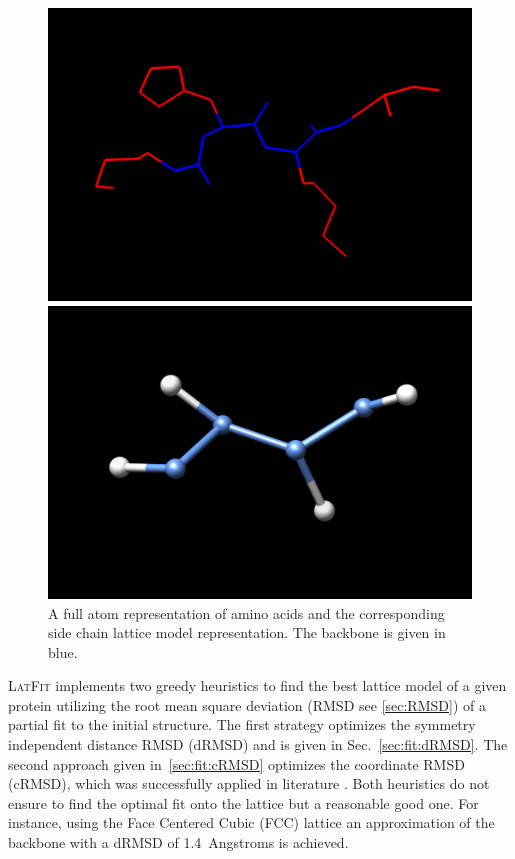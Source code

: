 \documentclass{article}
\newcommand{\latfit}{\textsc{LatFit}}
\begin{document}
\begin{figure}[H]
\begin{center}
	\begin{minipage}{0.4\textwidth}
		\includegraphics[width=\textwidth]{fit_pdb}
	\end{minipage}
	\begin{minipage}{0.4\textwidth}
		\includegraphics[width=\textwidth]{fit_lat_sc}
	\end{minipage}
\end{center}
\caption{A full atom representation of amino acids and the corresponding side
chain lattice model representation. The backbone is given in blue.}
\label{fig:pdb-lat}
\end{figure}

\vspace{0.5em}
\latfit{} implements two greedy heuristics to find the best lattice model of a
given protein utilizing the root mean square deviation (RMSD see \ref{sec:RMSD})
of a partial fit to the initial structure. The first strategy optimizes the
symmetry independent distance RMSD (dRMSD) and is given in
Sec.~\ref{sec:fit:dRMSD}. The second approach given in~\ref{sec:fit:cRMSD}
optimizes the coordinate RMSD (cRMSD), which was successfully applied in
literature
\cite{Park_Levitt:JMB:latFit:95,Miao.et.al:JMB:H-collapse:04,Godzik.et.al:JCC:globLat:93}.
Both heuristics do not ensure to find the optimal fit onto the lattice but a
reasonable good one. For instance, using the Face Centered Cubic (FCC) lattice an
approximation of the backbone with a dRMSD of 1.4~Angstroms is achieved.
\end{document}

